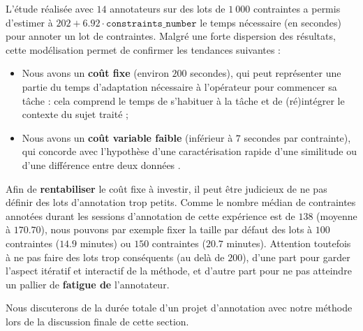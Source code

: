 			L'étude réalisée avec $14$ annotateurs sur des lots de $1~000$ contraintes a permis d'estimer à $202 + 6.92 \cdot \texttt{constraints\_number}$ le temps nécessaire (en secondes) pour annoter un lot de contraintes.
			Malgré une forte dispersion des résultats, cette modélisation permet de confirmer les tendances suivantes :
			\begin{itemize}
				\item Nous avons un \textbf{coût fixe} (environ $200$ secondes), qui peut représenter une partie du temps d'adaptation nécessaire à l'opérateur pour commencer sa tâche  : cela comprend le temps de s'habituer à la tâche et de (ré)intégrer le contexte du sujet traité ;
				\item Nous avons un \textbf{coût variable faible} (inférieur à $7$ secondes par contrainte), qui concorde avec l'hypothèse d'une caractérisation rapide d'une similitude ou d'une différence entre deux données .
			\end{itemize}
			Afin de \textbf{rentabiliser} le coût fixe à investir, il peut être judicieux de ne pas définir des lots d’annotation trop petits. 
			Comme le nombre médian de contraintes annotées durant les sessions d'annotation de cette expérience est de $138$ (moyenne à $170.70$), nous pouvons par exemple fixer la taille par défaut des lots à $100$ contraintes ($14.9$ minutes) ou $150$ contraintes ($20.7$ minutes).
			Attention toutefois à ne pas faire des lots trop conséquents (au delà de $200$), d'une part pour garder l'aspect itératif et interactif de la méthode, et d'autre part pour ne pas atteindre un pallier de \textbf{fatigue de} l'annotateur.
			
			Nous discuterons de la durée totale d'un projet d'annotation avec notre méthode lors de la discussion finale de cette section.
		
